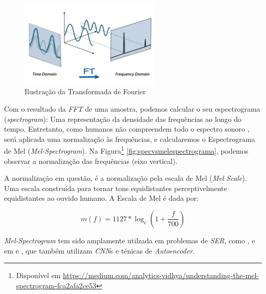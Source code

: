 \begin{figure}[!h]
\centering
\includegraphics[width=0.6\textwidth]{imagens/ft.png}
\caption{\label{fig:fouriertransform}Ilustração da Transformada de Fourier}
\end{figure}

\clearpage

Com o resultado da \textit{FFT} de uma amostra, podemos calcular o seu espectrograma (\textit{spectrogram}): Uma representação da densidade das frequências ao longo do tempo. Entretanto, como humanos não compreendem todo o espectro sonoro \cite{62}, será aplicada uma normalização às frequências, e calcularemos o Espectrograma de Mel (\textit{Mel-Spectrogram}). Na Figura\footnote{Disponível em \url{https://medium.com/analytics-vidhya/understanding-the-mel-spectrogram-fca2afa2ce53}} \ref{fig:specvsmelespectrograma}, podemos observar a normalização das frequências (eixo vertical).

A normalização em questão, é a normalização pela escala de Mel (\textit{Mel Scale}). Uma escala construída para tornar tons equidistantes perceptivelmente equidistantes ao ouvido humano. A Escala de Mel é dada por:

\begin{equation}
    m(f) = 1127 * \log_e{(1 + \frac{f}{700})}
\end{equation}

\textit{Mel-Spectrogram} tem sido amplamente utilzada em problemas de \textit{SER}, como \cite{32.25} \cite{32.30}, e em \cite{32.31} e \cite{32.32}, que também utilizam \textit{CNN}s e ténicas de \textit{Autoencoder}. %

